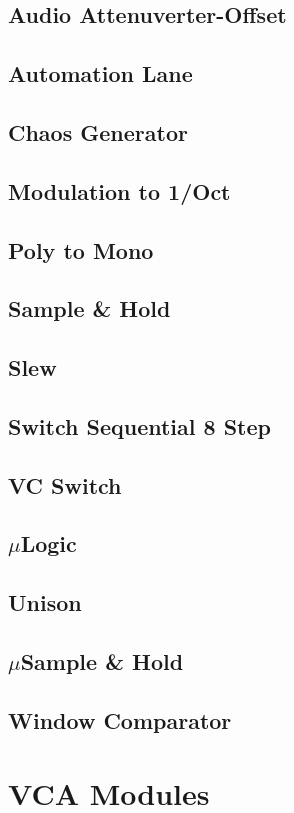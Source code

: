 \documentclass[11pt]{book}
\begin{document}
\section{Audio Attenuverter-Offset}
\pagebreak
\section{Automation Lane}
\pagebreak
\section{Chaos Generator}
\pagebreak
\section{Modulation to 1/Oct}
\pagebreak
\section{Poly to Mono}
\pagebreak
\section{Sample \& Hold}
\pagebreak
\section{Slew}
\pagebreak
\section{Switch Sequential 8 Step}
\pagebreak
\section{VC Switch}
\pagebreak
\section{$\mu$Logic}
\pagebreak
\section{Unison}
\pagebreak
\section{$\mu$Sample \& Hold}
\pagebreak
\section{Window Comparator}
\pagebreak

\chapter{VCA Modules}
\pagebreak
\end{document}
